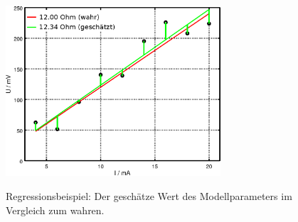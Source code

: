\documentclass[a4paper,12pt,DIV=15]{scrartcl}
\begin{document}
\begin{figure}
\begin{center}
\includegraphics[width=80mm]{media/learn_estimation_ohm_esti.eps}
\label{OhmResult}
\caption{Regressionsbeispiel: Der geschätze Wert des Modellparameters im Vergleich zum wahren.}
\end{center}
\end{figure}
\end{document}
